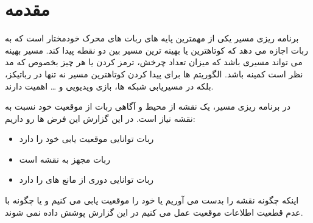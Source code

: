 \section{مقدمه}
برنامه ریزی مسیر یکی از مهمترین پایه های ربات های محرک خودمختار است که به ربات اجازه می دهد که کوتاهترین یا بهینه ترین مسیر بین دو نقطه پیدا کند. مسیر بهینه می تواند مسیری باشد که میزان تعداد چرخش، ترمز کردن یا هر چیز بخصوص که مد نظر است کمینه باشد. الگوریتم ها برای پیدا کردن کوتاهترین مسیر نه تنها در رباتیکز، بلکه در مسیریابی شبکه ها، بازی ویدیویی و … اهمیت دارند.

در برنامه ریزی مسیر، یک نقشه از محیط و آگاهی ربات از موقعیت خود نسبت به نقشه نیاز است. در این گزارش این فرض ها رو داریم:

\begin{itemize}
    \item ربات توانایی موقعیت یابی خود را دارد
    \item ربات مجهز به نقشه است
    \item ربات توانایی دوری از مانع های را دارد
\end{itemize}
اینکه چگونه نقشه را بدست می آوریم یا خود را موقعیت یابی می کنیم و یا چگونه با عدم قطعیت اطلاعات موقعیت عمل می کنیم در این گزارش پوشش داده نمی شوند.

